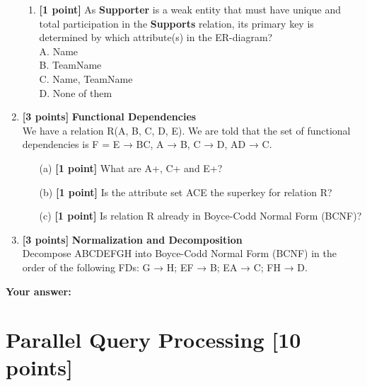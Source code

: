 \documentclass[10pt]{article}
\begin{document}
\begin{enumerate}
\begin{enumerate}
		      \item \textbf{[1 point]} As \textbf{Supporter} is a weak entity that must have unique and total participation in the \textbf{Supports} relation,
		            its primary key is determined by which attribute(s) in the ER-diagram? \\
		            A. Name \\
		            B. TeamName \\
		            C. Name, TeamName \\
		            D. None of them \\

	      \end{enumerate}


	\item \textbf{[3 points]} \textbf{Functional Dependencies} \\
	      We have a relation R(A, B, C, D, E). We are told that the set of functional dependencies is
	      F = {E → BC, A → B, C → D, AD → C}.
	      \begin{itemize}
		      \item[(a)] \textbf{[1 point]} What are A+, C+ and E+? \\
		      \item[(b)] \textbf{[1 point]} Is the attribute set ACE the superkey for relation R? \\
		      \item[(c)] \textbf{[1 point]} Is relation R already in Boyce-Codd Normal Form (BCNF)? \\
	      \end{itemize}


	\item \textbf{[3 points]} \textbf{Normalization and Decomposition} \\
	      Decompose ABCDEFGH into Boyce-Codd Normal Form (BCNF) in the order of the following FDs:
	      G → H; EF → B; EA → C; FH → D. \\

\end{enumerate}
\textbf{Your answer:}


\newpage
\section{Parallel Query Processing \textbf{[10 points]}}
\end{document}
